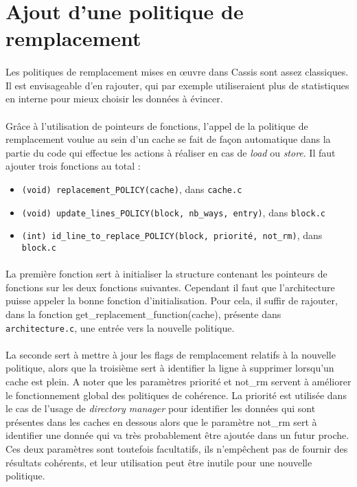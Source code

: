 \section{Ajout d'une politique de remplacement}

\paragraph{}
Les politiques de remplacement mises en {\oe}uvre dans \textsf{Cassis} sont assez classiques. Il est envisageable d'en rajouter, qui par exemple utiliseraient plus de statistiques en interne pour mieux choisir les données à évincer.

\paragraph{}
Grâce à l'utilisation de pointeurs de fonctions, l'appel de la politique de remplacement voulue au sein d'un cache se fait de façon automatique dans la partie du code qui effectue les actions à réaliser en cas de \emph{load} ou \emph{store}. Il faut ajouter trois fonctions au total :
\begin{itemize}
\item \texttt{(void) replacement\_POLICY(cache)}, dans \texttt{cache.c}
\item \texttt{(void) update\_lines\_POLICY(block, nb\_ways, entry)}, dans \texttt{block.c}
\item \texttt{(int) id\_line\_to\_replace\_POLICY(block, priorité, not\_rm)}, dans \texttt{block.c}
\end{itemize}

\paragraph{}
La première fonction sert à initialiser la structure contenant les pointeurs de fonctions sur les deux fonctions suivantes. Cependant il faut que l'architecture puisse appeler la bonne fonction d'initialisation. Pour cela, il suffir de rajouter, dans la fonction get\_replacement\_fun\-ction(cache), présente dans \texttt{architecture.c}, une entrée vers la nouvelle politique.

\paragraph{}
La seconde sert à mettre à jour les flags de remplacement relatifs à la nouvelle politique, alors que la troisième sert à identifier la ligne à supprimer lorsqu'un cache est plein. A noter que les paramètres priorité et not\_rm servent à améliorer le fonctionnement global des politiques de cohérence. La priorité est utilisée dans le cas de l'usage de \emph{directory manager} pour identifier les données qui sont présentes dans les caches en dessous alors que le paramètre not\_rm sert à identifier une donnée qui va très probablement être ajoutée dans un futur proche. Ces deux paramètres sont toutefois facultatifs, ils n'empêchent pas de fournir des résultats cohérents, et leur utilisation peut être inutile pour une nouvelle politique.

